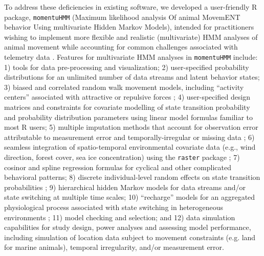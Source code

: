 \documentclass[12pt]{article}\usepackage[]{graphicx}\usepackage[]{color}
\begin{document}
To address these deficiencies in existing software, we developed a user-friendly R package, \verb|momentuHMM| (Maximum likelihood analysis Of animal MovemENT behavior Using multivariate Hidden Markov Models), intended for practitioners wishing to implement more flexible and realistic (multivariate) HMM analyses of animal movement while accounting for common challenges associated with telemetry data \citep{McClintockMichelot2018}. Features for multivariate HMM analyses in \verb|momentuHMM| include: 1) tools for data pre-processing and visualization; 2) user-specified probability distributions for an unlimited number of data streams and latent behavior states; 3) biased and correlated random walk movement models, including ``activity centers'' associated with attractive or repulsive forces \citep[e.g.][]{McClintockEtAl2012}; 4) user-specified design matrices and constraints for covariate modelling of state transition probability and probability distribution parameters using linear model formulas familiar to most R users; 5) multiple imputation methods that account for observation error attributable to measurement error and temporally-irregular or missing data \citep{HootenEtAl2017,McClintock2017}; 6) seamless integration of spatio-temporal environmental covariate data (e.g., wind direction, forest cover, sea ice concentration) using the \verb|raster| package \citep{Hijmans2016}; 7) cosinor \citep[e.g.][]{Cornelissen2014} and spline regression formulas for cyclical and other complicated behavioral patterns; 8) discrete individual-level random effects on state transition probabilities \citep[e.g.][]{DeRuiterEtAl2017}; 9) hierarchical hidden Markov models \citep[e.g.][]{Leos-BarajasEtAl2017,AdamEtAl2019} for data streams and/or state switching at multiple time scales; 10) ``recharge'' models for an aggregated physiological process associated with state switching in heterogeneous environments \citep{HootenEtAl2019}; 11) model checking and selection; and 12) data simulation capabilities for study design, power analyses and assessing model performance, including simulation of location data subject to movement constraints (e.g. land for marine animals), temporal irregularity, and/or measurement error. 
\end{document}
